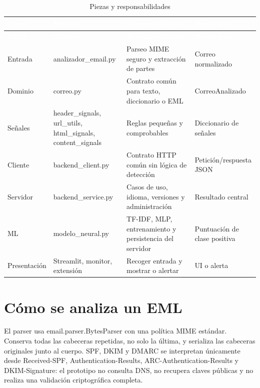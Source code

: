 \documentclass[11pt,a4paper]{article}
\begin{document}
\begingroup
  \small
  \begin{xltabular}{\textwidth}{|>{\raggedright\arraybackslash}p{2.45cm}|X|X|X|}
  \caption{Piezas y responsabilidades}\label{tab:comparativa-2}\\
    \hline
    \textcolor{white}{\textbf{Capa}} & \textcolor{white}{\textbf{Módulo}} & \textcolor{white}{\textbf{Responsabilidad}} & \textcolor{white}{\textbf{Resultado}} \\
    \hline
    \endfirsthead
    \hline
    \textcolor{white}{\textbf{Capa}} & \textcolor{white}{\textbf{Módulo}} & \textcolor{white}{\textbf{Responsabilidad}} & \textcolor{white}{\textbf{Resultado}} \\
    \hline
    \endhead
    Entrada & analizador\_email.py & Parseo MIME seguro y extracción de partes & Correo normalizado \\
    \hline
    Dominio & correo.py & Contrato común para texto, diccionario o EML & CorreoAnalizado \\
    \hline
    Señales & header\_signals, url\_utils, html\_signals, content\_signals & Reglas pequeñas y comprobables & Diccionario de señales \\
    \hline
    Cliente & backend\_client.py & Contrato HTTP común sin lógica de detección & Petición/\allowbreak{}respuesta JSON \\
    \hline
    Servidor & backend\_service.py & Casos de uso, idioma, versiones y administración & Resultado central \\
    \hline
    ML & modelo\_neural.py & TF-IDF, MLP, entrenamiento y persistencia del servidor & Puntuación de clase positiva \\
    \hline
    Presentación & Streamlit, monitor, extensión & Recoger entrada y mostrar o alertar & UI o alerta \\
    \hline
  \end{xltabular}
\endgroup

\section{Cómo se analiza un EML}

El parser usa email.parser.BytesParser con una política MIME estándar. Conserva todas las cabeceras repetidas, no solo la última, y serializa las cabeceras originales junto al cuerpo. SPF, DKIM y DMARC se interpretan únicamente desde Received-SPF, Authentication-Results, ARC-Authentication-Results y DKIM-Signature: el prototipo no consulta DNS, no recupera claves públicas y no realiza una validación criptográfica completa.
\end{document}
